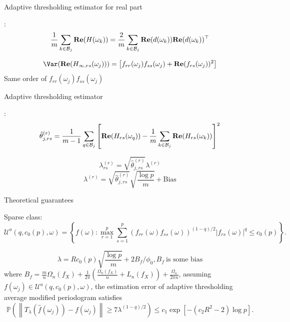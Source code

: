\documentclass[handout,xcolor={usenames,dvipsnames}]{beamer}
\begin{document}
\begin{frame}{Adaptive thresholding estimator for real part}
\bit 
\item {}: 
\[
\frac{1}{m} \sum_{k\in \mathcal{B}_j} {\bf Re}(H(\omega_k)) = \frac{2}{m}  \sum_{k\in \mathcal{B}_j}\mathbf{Re}(d(\omega_k))  \mathbf{Re}(d(\omega_k))^\top
\]
\item {}
\[
\Var(\mathbf{Re}(H_{\infty, rs}(\omega_j))) = \left[f_{rr}(\omega_j)f_{ss}(\omega_j)+\mathbf{Re}(f_{rs}(\omega_j))^2\right]
\]
Same order of $f_{rr}(\omega_j)f_{ss}(\omega_j)$
\eit 
\end{frame}


\begin{frame}{Adaptive thresholding estimator}
\bit 
\item {}: 
\begin{equation*}
\label{eq:variance_estimator}
\begin{aligned}
& \hat{\theta}^{(r)}_{j,rs} = \frac{1}{m-1}\sum_{q\in \mathcal{B}_j} \left[{\bf Re}(H_{rs}(\omega_q)) - \frac{1}{m}\sum_{k\in \mathcal{B}_j} {\bf Re}(H_{rs}(\omega_k))\right]^2 \\
\end{aligned}
\end{equation*}
\item {}
\[
\lambda^{(r)}_{rs} = \sqrt{\hat{\theta}^{(r)}_{j, rs}} \lambda^{(r)} 
\]
\[
\lambda^{(r)}  =   \sqrt{\hat{\theta}^{(r)}_{j, rs}} \sqrt{\frac{\log p}{m}}      +\text{Bias}
\]
\eit 
\end{frame}


\begin{frame}{Theoretical guarantees}
\bit 
\item Sparse class:
{
\small
\[
\mathcal{U}^a(q, c_0(p), \omega) = \left\{f(\omega): \max_{r=1}^p\sum_{s=1}^p (f_{rr}(\omega)f_{ss}(\omega))^{(1-q)/2} |f_{rs}(\omega)|^q \le c_0(p)\right \}.  
\]
}
\item
\begin{equation}
\label{eq:threshold_value}
\lambda = R c_0(p)\sqrt{\frac{\log p}{m}} +2B_f/\phi_0,  B_f ~\text{is some bias}
\end{equation}
where $B_f = \frac{m}{n}\Omega_n(f_X) + \frac{1}{2\pi}\left(\frac{\Omega_n(f_X)}{n}+L_n(f_X)\right) +\frac{\Omega_n}{2\pi n}$, 
assuming $f(\omega_j)\in \mathcal{U}^a(q, c_0(p), \omega)$, 
the estimation error of adaptive thresholding average modified periodogram satisfies 
{
\small 
\[
\mathbb{P}\left(\left\|T_{\lambda}(\hat{f}(\omega_j)) - f(\omega_j)\right\|\ge 7 \lambda^{(1-q)/2} \right)
\le c_1 \exp\left[-(c_2 R^2-2)\log p\right]. \nonumber
\]
}
\eit 
\end{frame}
\end{document}
